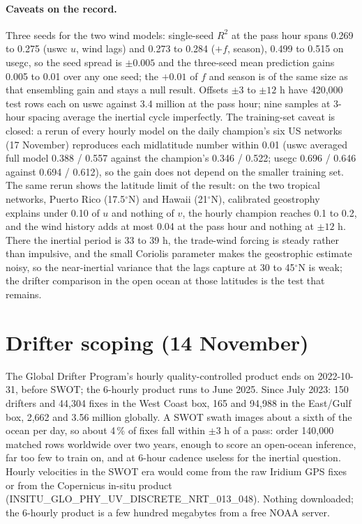\documentclass[11pt]{article}
\newcommand{\R}{R^2}
\begin{document}
\paragraph{Caveats on the record.} Three seeds for the two wind models: single-seed $\R$ at the pass hour spans 0.269 to 0.275 (uswc $u$, wind lags) and 0.273 to 0.284 ($+f$, season), 0.499 to 0.515 on usegc, so the seed spread is $\pm0.005$ and the three-seed mean prediction gains 0.005 to 0.01 over any one seed; the $+0.01$ of $f$ and season is of the same size as that ensembling gain and stays a null result. Offsets $\pm3$ to $\pm12$ h have 420,000 test rows each on uswc against 3.4 million at the pass hour; nine samples at 3-hour spacing average the inertial cycle imperfectly. The training-set caveat is closed: a rerun of every hourly model on the daily champion's six US networks (17 November) reproduces each midlatitude number within 0.01 (uswc averaged full model 0.388 / 0.557 against the champion's 0.346 / 0.522; usegc 0.696 / 0.646 against 0.694 / 0.612), so the gain does not depend on the smaller training set. The same rerun shows the latitude limit of the result: on the two tropical networks, Puerto Rico (17.5$^\circ$N) and Hawaii (21$^\circ$N), calibrated geostrophy explains under 0.10 of $u$ and nothing of $v$, the hourly champion reaches 0.1 to 0.2, and the wind history adds at most 0.04 at the pass hour and nothing at $\pm12$ h. There the inertial period is 33 to 39 h, the trade-wind forcing is steady rather than impulsive, and the small Coriolis parameter makes the geostrophic estimate noisy, so the near-inertial variance that the lags capture at 30 to 45$^\circ$N is weak; the drifter comparison in the open ocean at those latitudes is the test that remains.

\section{Drifter scoping (14 November)}

The Global Drifter Program's hourly quality-controlled product ends on 2022-10-31, before SWOT; the 6-hourly product runs to June 2025. Since July 2023: 150 drifters and 44,304 fixes in the West Coast box, 165 and 94,988 in the East/Gulf box, 2,662 and 3.56 million globally. A SWOT swath images about a sixth of the ocean per day, so about 4\,\% of fixes fall within $\pm3$ h of a pass: order 140,000 matched rows worldwide over two years, enough to score an open-ocean inference, far too few to train on, and at 6-hour cadence useless for the inertial question. Hourly velocities in the SWOT era would come from the raw Iridium GPS fixes or from the Copernicus in-situ product (INSITU\_GLO\_PHY\_UV\_DISCRETE\_NRT\_013\_048). Nothing downloaded; the 6-hourly product is a few hundred megabytes from a free NOAA server.
\end{document}
